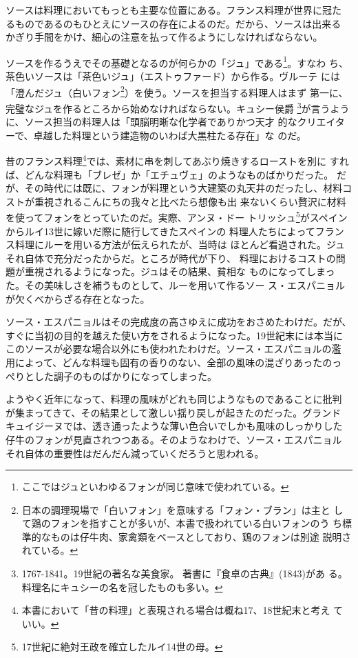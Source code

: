 \documentclass[twoside,12Q,b5paper]{escoffierltjsbook}
\begin{document}
ソースは料理においてもっとも主要な位置にある。フランス料理が世界に冠た
るものであるのもひとえにソースの存在によるのだ。だから、ソースは出来る
かぎり手間をかけ、細心の注意を払って作るようにしなければならない。

ソースを作るうえでその基礎となるのが何らかの「ジュ」である\footnote{ここではジュといわゆるフォンが同じ意味で使われている。}。すなわ
ち、茶色いソースは「茶色いジュ」（エストゥファード）から作る。ヴルーテ
には「澄んだジュ（白いフォン\footnote{日本の調理現場で「白いフォン」を意味する「フォン・ブラン」は主と
  して鶏のフォンを指すことが多いが、本書で扱われている白いフォンのう
  ち標準的なものは仔牛肉、家禽類をベースとしており、鶏のフォンは別途
  説明されている。}）を使う。ソースを担当する料理人はまず
第一に、完璧なジュを作るところから始めなければならない。キュシー侯爵
\footnote{1767-1841。19世紀の著名な美食家。
  著書に『食卓の古典』(1843)があ
  る。料理名にキュシーの名を冠したものも多い。}が言うように、ソース担当の料理人は「頭脳明晰な化学者でありかつ天才
的なクリエイターで、卓越した料理という建造物のいわば大黒柱たる存在」な
のだ。

昔のフランス料理\footnote{本書において「昔の料理」と表現される場合は概ね17、18世紀末と考え
  ていい。}では、素材に串を刺してあぶり焼きするローストを別に
すれば、どんな料理も「ブレゼ」か「エチュヴェ」のようなものばかりだった。
だが、その時代には既に、フォンが料理という大建築の丸天井のだったし、材料コストが重視されるこんにちの我々と比べたら想像も出
来ないくらい贅沢に材料を使ってフォンをとっていたのだ。実際、アンヌ・ドー
トリッシュ\footnote{17世紀に絶対王政を確立したルイ14世の母。}がスペインからルイ13世に嫁いだ際に随行してきたスペインの
料理人たちによってフランス料理にルーを用いる方法が伝えられたが、当時は
ほとんど看過された。ジュそれ自体で充分だったからだ。ところが時代が下り、
料理におけるコストの問題が重視されるようになった。ジュはその結果、貧相な
ものになってしまった。その美味しさを補うものとして、ルーを用いて作るソー
ス・エスパニョルが欠くべからざる存在となった。

ソース・エスパニョルはその完成度の高さゆえに成功をおさめたわけだ。だが、
すぐに当初の目的を越えた使い方をされるようになった。19世紀末には本当に
このソースが必要な場合以外にも使われたわけだ。ソース・エスパニョルの濫
用によって、どんな料理も固有の香りのない、全部の風味の混ざりあったのっ
ぺりとした調子のものばかりになってしまった。

ようやく近年になって、料理の風味がどれも同じようなものであることに批判
が集まってきて、その結果として激しい揺り戻しが起きたのだった。グランド
キュイジーヌでは、透き通ったような薄い色合いでしかも風味のしっかりした
仔牛のフォンが見直されつつある。そのようなわけで、ソース・エスパニョル
それ自体の重要性はだんだん減っていくだろうと思われる。
\end{document}
